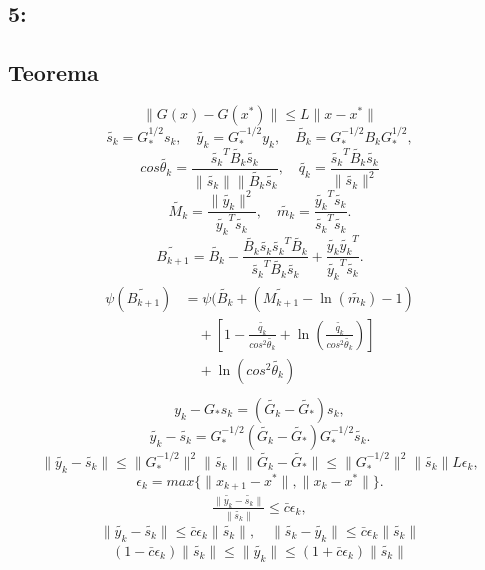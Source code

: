 \documentclass[12pt]{article}
\newcommand{\beas}{\begin{eqnarray*}}
\newcommand{\eeas}{\end{eqnarray*}}
\begin{document}
\subsection*{5:}
\subsection*{Teorema}

 \[ \|G(x) - G(x^*)\| \leq L \| x - x^* \|\]
 \[ \tilde{s_k} = G_{*}^{1/2}s_k, \quad \tilde{y_k} = G_{*}^{-1/2}y_k, \quad \tilde{B_k} = G_{*}^{-1/2} B_k G_{*}^{1/2},\]
 \[ cos \tilde{\theta_k} = \frac{\tilde{s_k}^T \tilde{B_k} \tilde{s_k}}{\|\tilde{s_k}\| \|\tilde{B_k} \tilde{s_k}},\quad \tilde{q_k} = \frac{\tilde{s_k}^T \tilde{B_k} \tilde{s_k}}{\|\tilde{s_k}\|^2}\]
 \[ \tilde{M_k} = \frac{\| \tilde{y_k} \|^2}{\tilde{y_k}^T \tilde{s_k}},\quad \tilde{m_k} = \frac{\tilde{y_k}^T \tilde{s_k} }{\tilde{s_k}^T \tilde{s_k}}.\]
\[ \tilde{B_{k+1}} = \tilde{B_{k}} - \frac{\tilde{B_{k}} \tilde{s_{k}} \tilde{s_{k}}^T \tilde{B_{k}}}{\tilde{s_{k}}^T \tilde{B_{k}} \tilde{s_{k}}} + \frac{\tilde{y_{k}} \tilde{y_{k}}^T }{\tilde{y_{k}}^T \tilde{s_{k}}}.\]
\beas
\begin{split}
\psi(\tilde{B_{k+1}}) & = \psi(\tilde{B_{k}} + (\tilde{M_{k+1}} - \ln(\tilde{m_{k}}) -1)\\
& \quad + \left[ 1 - \frac{\tilde{q_k}}{cos^2 \tilde{\theta_k}} + \ln\left(\frac{\tilde{q_k}}{cos^2 \tilde{\theta_k}} \right) \right]\\
& \quad + \ln\left(cos^2 \tilde{\theta_k} \right)\\
\end{split}
\eeas
\[ y_k - G_{*} s_k = (\tilde{G_k} - \tilde{G_{*}}) s_k,\]
\[ \tilde{y_k} - \tilde{s_k} = G_{*}^{-1/2} (\tilde{G_k} - \tilde{G_{*}}) G_{*}^{-1/2} \tilde{s_k}.\]
\[ \|\tilde{y_k} - \tilde{s_k}\| \leq \|G_{*}^{-1/2}\|^2 \|\tilde{s_k}\| \|\tilde{G_k} - \tilde{G_{*}}\| \leq \|G_{*}^{-1/2}\|^2 \|\tilde{s_k}\| L\epsilon_k,\]
\[ \epsilon_k = max\{ \|x_{k+1} - x^*\|, \|x_{k} - x^*\|\}.\]
\beas
\frac{\|\tilde{y_k} - \tilde{s_k}\|}{\| \tilde{s_k}\|} \leq \bar{c} \epsilon_k,
\eeas
\[
\| \tilde{y_{k}} -  \tilde{s_{k}} \| \leq \bar{c} \epsilon_k \| \tilde{s_{k}} \|, \quad \| \tilde{s_{k}} - \tilde{y_{k}}  \| \leq \bar{c} \epsilon_k \| \tilde{s_{k}} \|
\]
\beas
(1 - \bar{c} \epsilon_k) \| \tilde{s_{k}} \| \leq \| \tilde{y_{k}} \| \leq (1 + \bar{c} \epsilon_k) \| \tilde{s_{k}} \|
\eeas
\end{document}

